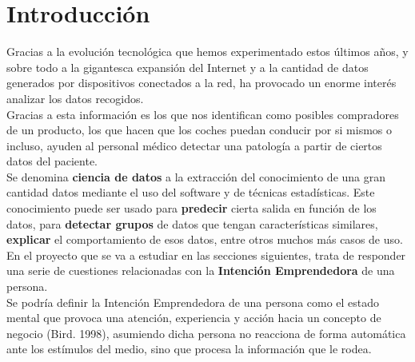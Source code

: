 \chapter{Introducción}
Gracias a la evolución tecnológica que hemos experimentado estos últimos años, y sobre todo a la gigantesca expansión del Internet y a la cantidad de datos generados por dispositivos conectados a la red, ha provocado un enorme interés analizar los datos recogidos.\\
Gracias a esta información es los que nos identifican como posibles compradores de un producto, los que hacen que los coches puedan conducir por si mismos o incluso, ayuden al personal médico detectar una patología a partir de ciertos datos del paciente.\\
\linebreak
Se denomina \textbf{ciencia de datos} a la extracción del conocimiento de una gran cantidad datos mediante el uso del software y de técnicas estadísticas. Este conocimiento puede ser usado para \textbf{predecir} cierta salida en función de los datos, para \textbf{detectar grupos} de datos que tengan características similares, \textbf{explicar} el comportamiento de esos datos, entre otros muchos más casos de uso. \\
\linebreak
En el proyecto que se va a estudiar en las secciones siguientes, trata de responder una serie de cuestiones relacionadas con la \textbf{Intención Emprendedora} de una persona.\\
Se podría definir la Intención Emprendedora de una persona como el estado mental que provoca una atención, experiencia y acción hacia un concepto de negocio (Bird. 1998), asumiendo dicha persona no reacciona de forma automática ante los estímulos del medio, sino que procesa la información que le rodea.
\clearpage
